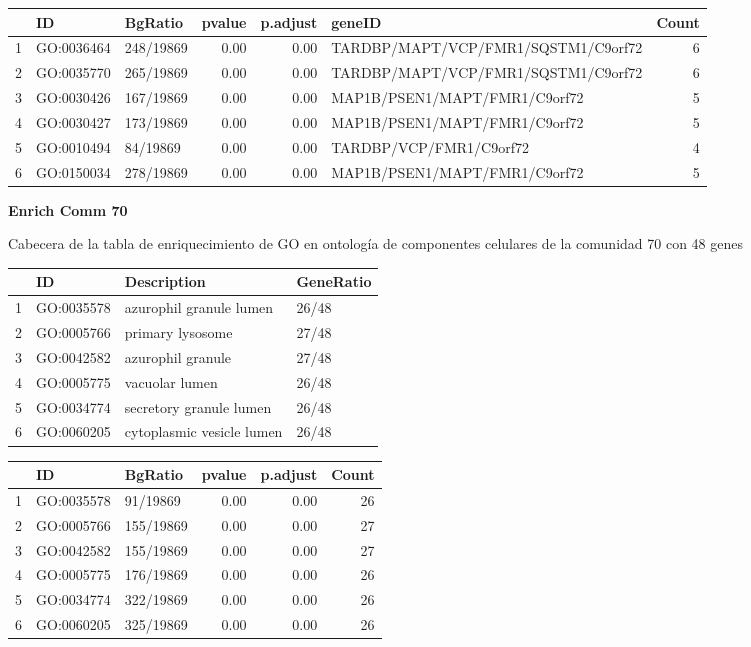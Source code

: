 \begin{table}[ht]
\centering
\begin{tabular}{rllrrlr}
  \hline
 & ID & BgRatio & pvalue & p.adjust & geneID & Count \\ 
  \hline
1 & GO:0036464 & 248/19869 & 0.00 & 0.00 & TARDBP/MAPT/VCP/FMR1/SQSTM1/C9orf72 &   6 \\ 
  2 & GO:0035770 & 265/19869 & 0.00 & 0.00 & TARDBP/MAPT/VCP/FMR1/SQSTM1/C9orf72 &   6 \\ 
  3 & GO:0030426 & 167/19869 & 0.00 & 0.00 & MAP1B/PSEN1/MAPT/FMR1/C9orf72 &   5 \\ 
  4 & GO:0030427 & 173/19869 & 0.00 & 0.00 & MAP1B/PSEN1/MAPT/FMR1/C9orf72 &   5 \\ 
  5 & GO:0010494 & 84/19869 & 0.00 & 0.00 & TARDBP/VCP/FMR1/C9orf72 &   4 \\ 
  6 & GO:0150034 & 278/19869 & 0.00 & 0.00 & MAP1B/PSEN1/MAPT/FMR1/C9orf72 &   5 \\ 
   \hline
\end{tabular}
\end{table}

\newpage

\textbf{Enrich Comm 70}

 Cabecera de la tabla de enriquecimiento de GO en ontología de componentes celulares de la comunidad 70 con 48 genes

\hfill

\begin{table}[ht]
\centering
\begin{tabular}{rlll}
  \hline
 & ID & Description & GeneRatio \\ 
  \hline
1 & GO:0035578 & azurophil granule lumen & 26/48 \\ 
  2 & GO:0005766 & primary lysosome & 27/48 \\ 
  3 & GO:0042582 & azurophil granule & 27/48 \\ 
  4 & GO:0005775 & vacuolar lumen & 26/48 \\ 
  5 & GO:0034774 & secretory granule lumen & 26/48 \\ 
  6 & GO:0060205 & cytoplasmic vesicle lumen & 26/48 \\ 
   \hline
\end{tabular}
\end{table}

\begin{table}[ht]
\centering
\begin{tabular}{rllrrr}
  \hline
 & ID & BgRatio & pvalue & p.adjust & Count \\ 
  \hline
1 & GO:0035578 & 91/19869 & 0.00 & 0.00 &  26 \\ 
  2 & GO:0005766 & 155/19869 & 0.00 & 0.00 &  27 \\ 
  3 & GO:0042582 & 155/19869 & 0.00 & 0.00 &  27 \\ 
  4 & GO:0005775 & 176/19869 & 0.00 & 0.00 &  26 \\ 
  5 & GO:0034774 & 322/19869 & 0.00 & 0.00 &  26 \\ 
  6 & GO:0060205 & 325/19869 & 0.00 & 0.00 &  26 \\ 
   \hline
\end{tabular}
\end{table}


